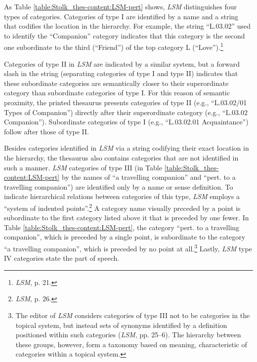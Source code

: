 As Table \ref{table:Stolk_thes-content:LSM-pert} shows, \textit{LSM} distinguishes four types of categories. 
Categories of type I are identified by a name and a string that codifies the location in the hierarchy. For example, the string ``L.03.02'' used to identify the ``Companion'' category indicates that this category is the second one subordinate to the third (``Friend'') of the top category L (``Love'').\footnote{\textit{LSM}, p. 21.} 

Categories of type II in \textit{LSM} are indicated by a similar system, but a forward slash in the string (separating categories of type I and type II) indicates that these subordinate categories are semantically closer to their superordinate category than subordinate categories of type I. For this reason of semantic proximity, the printed thesaurus presents categories of type II (e.g., ``L.03.02/01 Types of Companion'') directly after their superordinate category (e.g., ``L.03.02 Companion''). Subordinate categories of type I (e.g., ``L.03.02.01 Acquaintance'') follow after those of type II.

Besides categories identified in \textit{LSM} via a string codifying their exact location in the hierarchy, the thesaurus also contains categories that are not identified in such a manner. \textit{LSM} categories of type III (in Table \ref{table:Stolk_thes-content:LSM-pert} by the names of ``a travelling companion'' and ``pert. to a travelling companion'') are identified only by a name or sense definition. To indicate hierarchical relations between categories of this type, \textit{LSM} employs a ``system of indented points''.\footnote{\textit{LSM}, p. 26.} A category name visually preceded by a point is subordinate to the first category listed above it that is preceded by one fewer. In Table \ref{table:Stolk_thes-content:LSM-pert}, the category ``pert. to a travelling companion'', which is preceded by a single point, is subordinate to the category ``a travelling companion'', which is preceded by no point at all.\footnote{The editor of \textit{LSM} considers categories of type III not to be categories in the topical system, but instead sets of synonyms identified by a definition positioned within such categories (\textit{LSM}, pp. 25–6). The hierarchy between these groups, however, form a taxonomy based on meaning, characteristic of categories within a topical system.}
Lastly, \textit{LSM} type IV categories state the part of speech.


